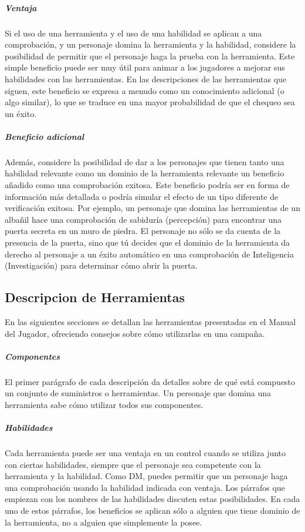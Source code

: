\documentclass[a4paper,twocolumn,openany,10pt]{dndbook}
\begin{document}
\subparagraph{Ventaja} Si el uso de una herramienta y el uso de una habilidad se aplican a una comprobación, y un personaje domina
la herramienta y la habilidad, considere la posibilidad de permitir que el personaje haga la prueba con la herramienta. Este
simple beneficio puede ser muy útil para animar a los jugadores a mejorar sus habilidades con las herramientas. En las
descripciones de las herramientas que siguen, este beneficio se expresa a menudo como un conocimiento adicional (o algo similar),
lo que se traduce en una mayor probabilidad de que el chequeo sea un éxito.

\subparagraph{Beneficio adicional} Además, considere la posibilidad de dar a los personajes que tienen tanto una habilidad
relevante como un dominio de la herramienta relevante un beneficio añadido como una comprobación exitosa. Este beneficio podría
ser en forma de información más detallada o podría simular el efecto de un tipo diferente de verificación exitosa. Por ejemplo, un
personaje que domina las herramientas de un albañil hace una comprobación de sabiduría (percepción) para encontrar una puerta
secreta en un muro de piedra. El personaje no sólo se da cuenta de la presencia de la puerta, sino que tú decides que el dominio
de la herramienta da derecho al personaje a un éxito automático en una comprobación de Inteligencia (Investigación) para
determinar cómo abrir la puerta. 

\subsection{Descripcion de Herramientas}
En las siguientes secciones se detallan las herramientas presentadas en el Manual del Jugador, ofreciendo consejos sobre cómo
utilizarlas en una campaña.

\subparagraph{Componentes} El primer parágrafo de cada descripción da detalles sobre de qué está compuesto un conjunto de
suministros o herramientas. Un personaje que domina una herramienta sabe cómo utilizar todos sus componentes.

\subparagraph{Habilidades} Cada herramienta puede ser una ventaja en un control cuando se utiliza junto con ciertas habilidades,
siempre que el personaje sea competente con la herramienta y la habilidad. Como DM, puedes permitir que un personaje haga una
comprobación usando la habilidad indicada con ventaja. Los párrafos que empiezan con los nombres de las habilidades discuten estas
posibilidades. En cada uno de estos párrafos, los beneficios se aplican sólo a alguien que tiene dominio de la herramienta, no a
alguien que simplemente la posee.
\end{document}
